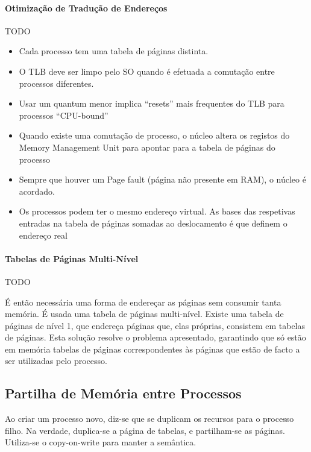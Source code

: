 \documentclass[11pt]{article}
\begin{document}
\paragraph{Otimização de Tradução de Endereços}

TODO

\begin{itemize}
    \item Cada processo tem uma tabela de páginas distinta.
    \item O TLB deve ser limpo pelo SO quando é efetuada a comutação entre processos diferentes.
    \item Usar um quantum menor implica “resets” mais frequentes do TLB para processos “CPU-bound”
    \item Quando existe uma comutação de processo, o núcleo altera os registos do Memory Management Unit para apontar para a tabela de páginas do processo
    \item Sempre que houver um Page fault (página não presente em RAM), o núcleo é acordado.
    \item Os processos podem ter o mesmo endereço virtual. As bases das respetivas
          entradas na tabela de páginas somadas ao deslocamento é que definem o endereço real
\end{itemize}

\paragraph{Tabelas de Páginas Multi-Nível}

TODO

É então necessária uma forma de endereçar as páginas sem consumir tanta memória. É usada uma tabela de páginas multi-nível. Existe uma tabela de páginas de nível 1, que endereça páginas que, elas próprias, consistem em tabelas de páginas. Esta solução resolve o problema apresentado, garantindo que só estão em memória tabelas de páginas correspondentes às páginas que estão de facto a ser utilizadas pelo processo.

\subsection{Partilha de Memória entre Processos}

Ao criar um processo novo, diz-se que se duplicam os recursos para o processo filho. Na verdade, duplica-se a página de tabelas, e partilham-se as páginas. Utiliza-se o copy-on-write para manter a semântica.
\end{document}
